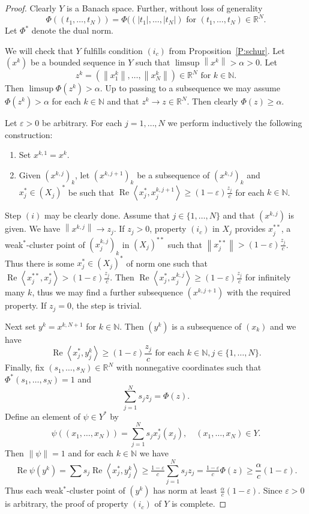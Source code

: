 \documentclass{amsart}
\numberwithin{equation}{section}
\theoremstyle{definition}
\def\ep{\varepsilon}
\def\en{\mathbb N}
\def\er{\mathbb R}
\def\ip#1#2{\left\langle#1,#2\right\rangle}
\newcommand{\norm}[1]{\left\|#1\right\|}
\renewcommand{\Re}{\operatorname{Re}}
\newcommand{\abs}[1]{\left|#1\right|}
\begin{document}
\begin{proof}
    Clearly $Y$ is a Banach space. Further, without loss of generality
    $$\Phi((t_1,\dots,t_N))=\Phi((\abs{t_1},\dots,\abs{t_N})\mbox{  for }(t_1,\dots,t_N)\in\er^N.$$ Let $\Phi^*$ denote the dual norm.

     We will check that $Y$ fulfills condition $(i_c)$ from Proposition~\ref{P:schur}. Let $(x^k)$ be a bounded sequence in $Y$ such that $\limsup\norm{x^k}>\alpha>0$. Let
     $$z^k=(\norm{x^k_1},\dots,\norm{x^k_N})\in\er^N \mbox{ for }k\in\en.$$ Then $\limsup \Phi(z^k)>\alpha$.
     Up to passing to a subsequence we may assume $\Phi(z^k)>\alpha$ for each $k\in\en$
     and that $z^k\to z\in\er^N$. Then clearly $\Phi(z)\ge\alpha$.

     Let $\ep>0$ be arbitrary.  For each $j=1,\dots,N$ we perform inductively the following construction:
     \begin{enumerate}[$(i)$]
         \item Set $x^{k,1}=x^k$.
         \item Given $(x^{k,j})_k$, let $(x^{k,j+1})_k$ be a subsequence of $(x^{k,j})_k$ and $x_j^*\in (X_j)^*$ be such that $\Re\ip{x_j^*}{x^{k,j+1}_j}\ge (1-\ep)\frac{z_j}{c}$  for each $k\in\en$.
     \end{enumerate}
     
     Step $(i)$ may be clearly done. Assume that $j\in\{1,\dots,N\}$ and that $(x^{k,j})$ is given. We have $\norm{x^{k,j}}\to z_j$. If $z_j>0$, property $(i_c)$ in $X_j$ provides $x^{**}_j$, a weak$^*$-cluster point of $(x^{k,j}_j)_k$ in $(X_j)^{**}$ such that $\norm{x^{**}_j}>(1-\ep)\frac{z_j}{c}$. Thus there is some $x_j^*\in (X_j)^*$ of norm one such that $\Re\ip{x^{**}_j}{x^*_j}>(1-\ep)\frac{z_j}{c}$. Then $\Re\ip{x_j^*}{x^{k,j}_j}\ge (1-\ep)\frac{z_j}{c}$ for infinitely many $k$, thus we may find a further subsequence $(x^{k,j+1})$ with the required property.
     If $z_j=0$, the step is trivial.

     Next set $y^k=x^{k,N+1}$ for $k\in\en$. Then $(y^k)$ is a subsequence of $(x_k)$ and we have
     $$\Re\ip{x_j^*}{y^{k}_j}\ge (1-\ep)\frac{z_j}{c}\mbox{ for each }k\in\en, j\in\{1,\dots,N\}.$$
     Finally, fix $(s_1,\dots,s_N)\in \er^N$ with nonnegative coordinates such that $\Phi^*(s_1,\dots,s_N)=1$ and
     $$\sum_{j=1}^N s_j z_j=\Phi(z).$$
     Define an element of $\psi\in Y^*$ by 
     $$\psi((x_1,\dots,x_N))=\sum_{j=1}^N s_j x^*_j(x_j),\quad (x_1,\dots,x_N)\in Y.$$
     Then $\norm{\psi}=1$ and for each $k\in\en$ we have
     $$\Re \psi(y^k)=\sum s_j\Re\ip{x_j^*}{y^{k}_j}\ge\tfrac{1-\ep}c \sum_{j=1}^N s_j z_j=\tfrac{1-\ep}c \Phi(z)\ge \frac\alpha c(1-\ep).$$
     Thus each weak$^*$-cluster point of $(y^k)$ has norm at least $\frac\alpha c(1-\ep)$. Since $\ep>0$ is arbitrary, the proof of property $(i_c)$ of $Y$ is complete.
\end{proof}
\end{document}
